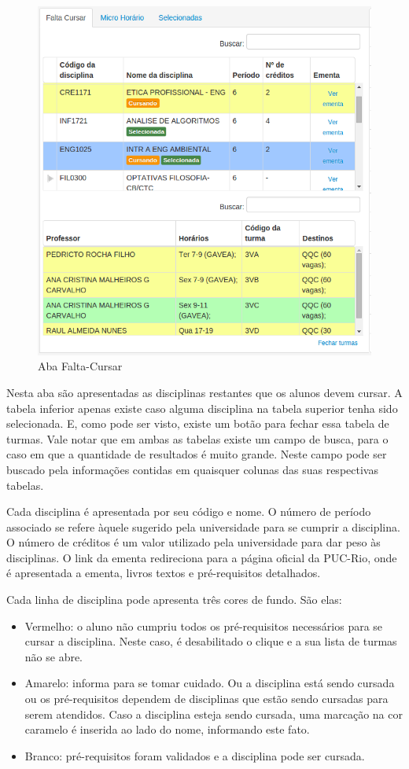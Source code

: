 \documentclass[graduacao,brazil]{ThesisPUC}
\begin{document}
\begin{figure}[H]
    \centering
    \includegraphics[width=0.7\linewidth]{img/v3_aba_falta_cursar.png}
    \caption{Aba Falta-Cursar}
\end{figure}

Nesta aba são apresentadas as disciplinas restantes que os alunos devem cursar. A tabela inferior apenas existe caso alguma disciplina na tabela superior tenha sido selecionada. E, como pode ser visto, existe um botão para fechar essa tabela de turmas. Vale notar que em ambas as tabelas existe um campo de busca, para o caso em que a quantidade de resultados é muito grande. Neste campo pode ser buscado pela informações contidas em quaisquer colunas das suas respectivas tabelas. 

Cada disciplina é apresentada por seu código e nome. O número de período associado se refere àquele sugerido pela universidade para se cumprir a disciplina. O número de créditos é um valor utilizado pela universidade para dar peso às disciplinas. O link da ementa redireciona para a página oficial da PUC-Rio, onde é apresentada a ementa, livros textos e pré-requisitos detalhados. 

Cada linha de disciplina pode apresenta três cores de fundo. São elas:

\begin{itemize}
	\item Vermelho: o aluno não cumpriu todos os pré-requisitos necessários para se cursar a disciplina. Neste caso, é desabilitado o clique e a sua lista de turmas não se abre. 
	\item Amarelo: informa para se tomar cuidado. Ou a disciplina está sendo cursada ou os pré-requisitos dependem de disciplinas que estão sendo cursadas para serem atendidos. Caso a disciplina esteja sendo cursada, uma marcação na cor caramelo é inserida ao lado do nome, informando este fato. 
	\item Branco: pré-requisitos foram validados e a disciplina pode ser cursada.
\end{itemize}
\end{document}
